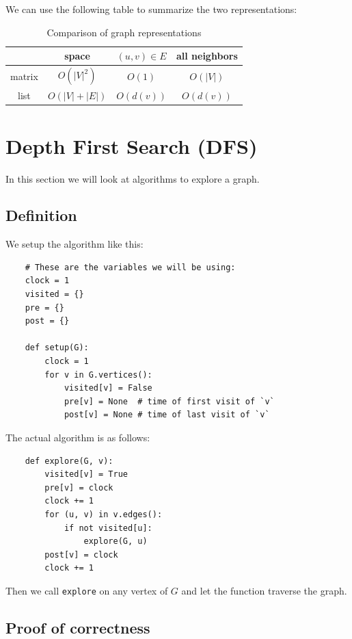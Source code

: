 \documentclass[12pt]{extarticle}
\begin{document}
We can use the following table to summarize the two representations:

\begin{table}[H]
    \centering
    \begin{tabular}{ |c|c|c|c| }
        \hline
               & space          & $(u, v) \in E$ & all neighbors \\
        \hline
        matrix & $O(|V|^2)$     & $O(1)$         & $O(|V|)$      \\
        list   & $O(|V| + |E|)$ & $O(d(v))$      & $O(d(v))$     \\
        \hline
    \end{tabular}
    \caption{Comparison of graph representations}
    \label{tab:graphrepr}
\end{table}

\section{Depth First Search (DFS)}

In this section we will look at algorithms to explore a graph.

\subsection{Definition}

We setup the algorithm like this:

\begin{verbatim}
    # These are the variables we will be using:
    clock = 1
    visited = {}
    pre = {}
    post = {}

    def setup(G):
        clock = 1
        for v in G.vertices():
            visited[v] = False
            pre[v] = None  # time of first visit of `v`
            post[v] = None # time of last visit of `v`
\end{verbatim}

The actual algorithm is as follows:

\begin{verbatim}
    def explore(G, v):
        visited[v] = True
        pre[v] = clock
        clock += 1
        for (u, v) in v.edges():
            if not visited[u]:
                explore(G, u)
        post[v] = clock
        clock += 1
\end{verbatim}

Then we call \texttt{explore} on any vertex of $G$ and let the function traverse the graph.

\subsection{Proof of correctness}
\end{document}
